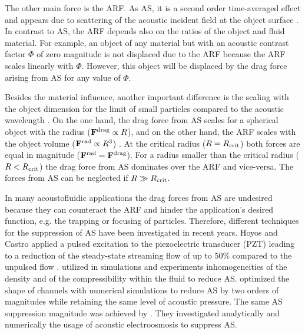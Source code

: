 The other main force is the ARF. As AS, it is a second order time-averaged 
effect and appears due to scattering of the acoustic incident field at the 
object surface \cite{Yosioka1955,Bruus2012,Gorkov1962}. In contrast to AS, the 
ARF depends also on the ratios of the object and fluid material. For example, 
an object of any material but with an acoustic contrast factor $\Phi$ 
\cite{Bruus2012} of zero magnitude is not displaced due to the ARF because the 
ARF scales linearly with $\Phi$. However, this object will be displaced by the 
drag force arising from AS for any value of $\Phi$.

Besides the material influence, another important difference is the scaling 
with the object dimension for the limit of small particles compared to the 
acoustic wavelength \cite{Bruus2012,King1934}. On the one hand, the drag force 
from AS scales for a spherical object with the radius ($\vb{F}^{\mathrm{drag}}\propto R$), and 
on the other hand, the ARF scales with the object volume ($\vb{F}^{\mathrm{rad}}\propto 
R^{3}$) \cite{Bruus2012}. At the critical radius ($R=R_{\mathrm{crit}}$) both forces are 
equal in magnitude ($\vb{F}^{\mathrm{rad}}=\vb{F}^{\mathrm{drag}}$). For a radius smaller than the critical 
radius ($R<R_{\mathrm{crit}}$) \cite{Bruus2012,Barnkob2012} the drag force from AS 
dominates over the ARF and vice-versa. The forces from AS can be neglected if 
$R\gg R_{\mathrm{crit}}$.

In many acoustofluidic applications the drag forces from AS are undesired 
because they can counteract the ARF \cite{VanAssche2020,Antfolk2014} and hinder 
the application's desired function, e.g. the trapping or focusing of particles. 
Therefore, different techniques for the suppression of AS have been 
investigated in recent years. Hoyos and Castro applied a pulsed excitation to 
the piezoelectric transducer (PZT) leading to a reduction of the steady-state 
streaming flow of up to 50\% compared to the unpulsed flow 
\cite{Hoyos2013,Castro2016}.  utilized in simulations and 
experiments inhomogeneities of the density and of the compressibility within 
the fluid to reduce AS.  optimized the shape of channels with 
numerical simulations to reduce AS by two orders of magnitudes while retaining 
the same level of acoustic pressure. The same AS suppression magnitude was 
achieved by . They investigated analytically and 
numerically the usage of acoustic electroosmosis to suppress AS.

